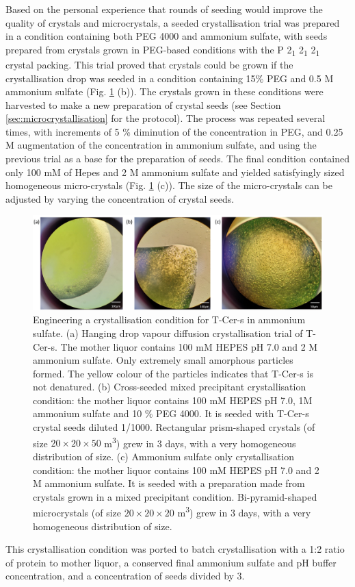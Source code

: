 Based on the personal experience that rounds of seeding would improve the quality of crystals and microcrystals, a seeded crystallisation trial was prepared in a condition containing both PEG 4000 and ammonium sulfate, with seeds prepared from crystals grown in PEG-based conditions with the P 2\textsubscript{1} 2\textsubscript{1} 2\textsubscript{1} crystal packing. This trial proved that crystals could be grown if the crystallisation drop was seeded in a condition containing 15\% PEG and 0.5 M ammonium sulfate (Fig. \ref{fig:T-Cer-NH4} (b)). The crystals grown in these conditions were harvested to make a new preparation of crystal seeds (see Section \ref{sec:microcrystallisation} for the protocol). The process was repeated several times, with increments of 5 \% diminution of the concentration in PEG, and 0.25 M augmentation of the concentration in ammonium sulfate, and using the previous trial as a base for the preparation of seeds. The final condition contained only 100 mM of Hepes and 2 M ammonium sulfate and yielded satisfyingly sized homogeneous micro-crystals (Fig. \ref{fig:T-Cer-NH4} (c)). The size of the micro-crystals can be adjusted by varying the concentration of crystal seeds. 
\begin{figure}[H] %
    \centering
        \noindent \includegraphics[width=\textwidth]{images/T-Cer/NH4_crystallisation_T-Cer-s.pdf}
    \hfill
    \caption{Engineering a crystallisation condition for T-Cer-s in ammonium sulfate. (a) Hanging drop vapour diffusion crystallisation trial of T-Cer-s. The mother liquor contains 100 mM HEPES pH 7.0 and 2 M ammonium sulfate. Only extremely small amorphous particles formed. The yellow colour of the particles indicates that T-Cer-s is not denatured. (b) Cross-seeded mixed precipitant crystallisation condition: the mother liquor contains 100 mM HEPES pH 7.0, 1M ammonium sulfate and 10 \% PEG 4000. It is seeded with T-Cer-s crystal seeds diluted 1/1000. Rectangular prism-shaped crystals (of size \(20 \times 20 \times 50 \) \textmu m\textsuperscript{3}) grew in 3 days, with a very homogeneous distribution of size.  (c) Ammonium sulfate only crystallisation condition: the mother liquor contains 100 mM HEPES pH 7.0 and 2 M ammonium sulfate. It is seeded with a preparation made from crystals grown in a mixed precipitant condition. Bi-pyramid-shaped microcrystals (of size \(20 \times 20 \times 20 \) \textmu m\textsuperscript{3}) grew in 3 days, with a very homogeneous distribution of size.}\label{fig:T-Cer-NH4}
\end{figure}
This crystallisation condition was ported to batch crystallisation with a 1:2 ratio of protein to mother liquor, a conserved final ammonium sulfate and pH buffer concentration, and a concentration of seeds divided by 3. 


